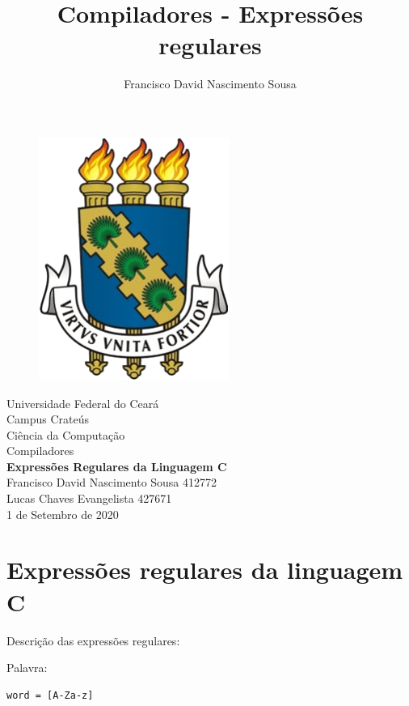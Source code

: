 \documentclass[]{article}
\title{Compiladores - Expressões regulares}
\author{Francisco David Nascimento Sousa}
\numberwithin{equation}{section}
\begin{document}
\begin{titlepage}

\begin{center}

	\begin{figure}[h]
		\centering
		\includegraphics[scale=0.5]{ufc_simbol.png}
		\label{Rotulo}
	\end{figure}

	{\LARGE Universidade Federal do Ceará}\\[0.2cm]
	
	{\Large Campus Crateús}\\[0.5cm]
	
	{\large Ciência da Computação}\\[0.2cm]
	
	{\large Compiladores}\\[5.1cm]
	
	{\bf \huge Expressões Regulares da Linguagem C}\\[3.1cm]
	
	{\large Francisco David Nascimento Sousa 412772} \\ [0.2cm]
  {\large Lucas Chaves Evangelista 427671} \\[2.7cm]
	
	{\large 1 de Setembro de 2020}
\end{center}

\end{titlepage}

\section{Expressões regulares da linguagem C}
Descrição das expressões regulares:

Palavra:
\begin{lstlisting}
word = [A-Za-z]
\end{lstlisting}
\end{document}
